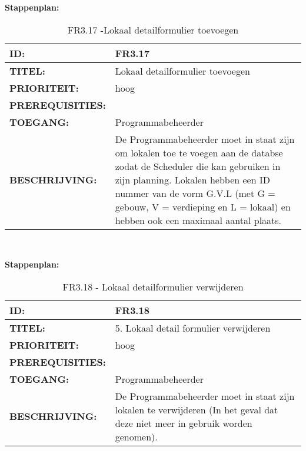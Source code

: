 \textbf{Stappenplan:}
   
\noindent\begin{table}[H]
            \begin{tabular}{l | p{10cm}}
                \textbf{ID:} & FR3.17 \\ \hline
                \textbf{TITEL:} & Lokaal detailformulier toevoegen\\ \hline
                \textbf{PRIORITEIT:} &  hoog \\ \hline
                \textbf{PREREQUISITIES:} & \\ \hline
                \textbf{TOEGANG:} & Programmabeheerder \\ \hline
                \textbf{BESCHRIJVING:} & De Programmabeheerder moet in staat zijn om lokalen toe te voegen aan de databse zodat de Scheduler die kan gebruiken in zijn planning. Lokalen hebben een ID nummer van de vorm G.V.L (met G = gebouw, V = verdieping en L = lokaal) en hebben ook een maximaal aantal plaats.\\ 
            \end{tabular}\\
            \caption{FR3.17 -Lokaal detailformulier toevoegen}
            \label{tab:FR3.17 - Lokaal detailformulier toevoegen}
        \end{table}

\textbf{Stappenplan:}

\noindent\begin{table}[H]
            \begin{tabular}{l | p{10cm}}
                \textbf{ID:} & FR3.18 \\ \hline
                \textbf{TITEL:} & 5. Lokaal detail formulier verwijderen\\ \hline
                \textbf{PRIORITEIT:} &  hoog \\ \hline
                \textbf{PREREQUISITIES:} & \\ \hline
                \textbf{TOEGANG:} & Programmabeheerder \\ \hline
                \textbf{BESCHRIJVING:} & De Programmabeheerder moet in staat zijn lokalen te verwijderen (In het geval dat deze niet meer in gebruik worden genomen).\\ 
            \end{tabular}\\
            \caption{FR3.18 - Lokaal detailformulier verwijderen}
            \label{tab:FR3.18 - Lokaal detailformulier verwijderen}
        \end{table}

